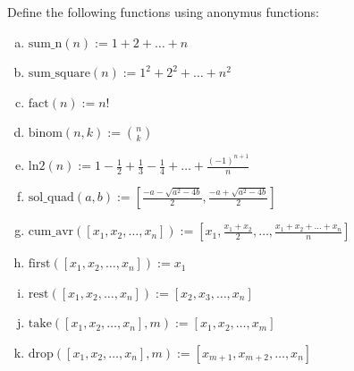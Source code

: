 \documentclass[a4paper, fleqn, 10pt]{report}
\theoremstyle{definition}
\newenvironment{prb*}[1]
  {\renewcommand\theprb{\thechapter.\arabic{prb}\rlap{$^{#1}$}}\prb}
  {\endprb}
\begin{document}
\begin{prb*}{2}
Define the following functions using anonymus functions:
\begin{multicols}{2}
\begin{enumerate}[a)]
 \item $\mathrm{sum\_n}(n) := 1 + 2 + \dots + n$
 \item $\mathrm{sum\_square}(n):= 1^2 + 2^2 + \dots + n^2$
 \item $\mathrm{fact}(n) := n!$
 \item $\mathrm{binom}(n,k) := \binom{n}{k}$
 \item $\mathrm{ln2}(n) := 1 - \frac{1}{2} + \frac{1}{3} - \frac{1}{4} + \dots + \frac{(-1)^{n+1}}{n}$
 \item $\mathrm{sol\_quad}(a, b) := [\frac{-a-\sqrt{a^2-4b}}{2}, \frac{-a+\sqrt{a^2-4b}}{2}]$
 \item $\mathrm{cum\_avr}([x_1, x_2, \dots, x_n]) := [x_1, \frac{x_1 + x_2}{2}, \dots, \frac{x_1 + x_2 + \dots + x_n}{n}]$
 \item $\mathrm{first}([x_1, x_2, \dots, x_n]) := x_1$
 \item $\mathrm{rest}([x_1, x_2, \dots, x_n]) := [x_2, x_3, \dots, x_n]$
 \item $\mathrm{take}([x_1, x_2, \dots, x_n], m) := [x_1, x_2, \dots, x_m]$
 \item $\mathrm{drop}([x_1, x_2, \dots, x_n], m) := [x_{m+1}, x_{m+2}, \dots, x_n]$
\end{enumerate}
\end{multicols}
\end{prb*}
\end{document}
